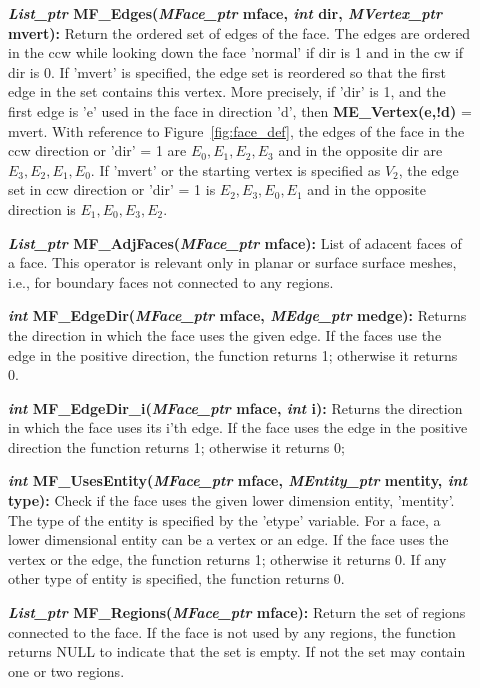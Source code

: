 \documentclass[12pt]{article}
\begin{document}
\begin{description}
\item[]\textbf{\textit{List\_ptr} MF\_Edges(\textit{MFace\_ptr} mface,
    \textit{int} dir, \textit{MVertex\_ptr} mvert):} Return the
  ordered set of edges of the face. The edges are ordered in the ccw
  while looking down the face 'normal' if dir is 1 and in the cw if
  dir is 0. If 'mvert' is specified, the edge set is reordered so that
  the first edge in the set contains this vertex. More precisely, if
  'dir' is 1, and the first edge is 'e' used in the face in direction
  'd', then \textbf{ME\_Vertex(e,!d)} = mvert. With reference to
  Figure~\ref{fig:face_def}, the edges of the face in the ccw direction or
  'dir' = 1 are ${E_0,E_1,E_2,E_3}$ and in the opposite dir are
  ${E_3,E_2,E_1,E_0}$. If 'mvert' or the starting vertex is specified
  as $V_2$, the edge set in ccw direction or 'dir' = 1 is
  ${E_2,E_3,E_0,E_1}$ and in the opposite direction is
  ${E_1,E_0,E_3,E_2}$.

\item[]\textbf{\textit{List\_ptr} MF\_AdjFaces(\textit{MFace\_ptr} mface):}
List of adacent faces of a face. This operator is relevant only in
planar or surface surface meshes, i.e., for boundary faces not
connected to any regions.

\item[]\textbf{\textit{int} MF\_EdgeDir(\textit{MFace\_ptr} mface,
\textit{MEdge\_ptr} medge):} Returns the direction in which the face
uses the given edge. If the faces use the edge in the positive direction,
the function returns 1; otherwise it returns 0.

\item[]\textbf{\textit{int} MF\_EdgeDir\_i(\textit{MFace\_ptr} mface,
\textit{int} i):} Returns the direction in which the face uses its i'th
edge. If the face uses the edge in the positive direction the function
returns 1; otherwise it returns 0;

\item[]\textbf{\textit{int} MF\_UsesEntity(\textit{MFace\_ptr} mface,
\textit{MEntity\_ptr} mentity, \textit{int} type):} Check if the face
uses the given lower dimension entity, 'mentity'. The type of the
entity is specified by the 'etype' variable. For a face, a lower
dimensional entity can be a vertex or an edge. If the face uses the
vertex or the edge, the function returns 1; otherwise it returns 0. If
any other type of entity is specified, the function returns 0.

\item[]\textbf{\textit{List\_ptr} MF\_Regions(\textit{MFace\_ptr} mface):}
Return the set of regions connected to the face. If the face is not
used by any regions, the function returns NULL to indicate that the
set is empty. If not the set may contain one or two regions.


\end{description}
\end{document}
